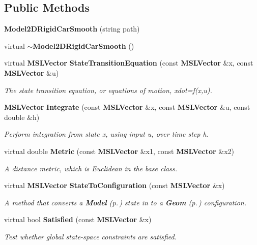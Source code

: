 \subsection*{Public Methods}
\begin{CompactItemize}
\item 
{\bf Model2DRigid\-Car\-Smooth} (string path)
\item 
virtual {\bf $\sim$Model2DRigid\-Car\-Smooth} ()
\item 
virtual {\bf MSLVector} {\bf State\-Transition\-Equation} (const {\bf MSLVector} \&x, const {\bf MSLVector} \&u)
\begin{CompactList}\small\item\em The state transition equation, or equations of motion, xdot=f(x,u).\item\end{CompactList}\item 
{\bf MSLVector} {\bf Integrate} (const {\bf MSLVector} \&x, const {\bf MSLVector} \&u, const double \&h)
\begin{CompactList}\small\item\em Perform integration from state x, using input u, over time step h.\item\end{CompactList}\item 
virtual double {\bf Metric} (const {\bf MSLVector} \&x1, const {\bf MSLVector} \&x2)
\begin{CompactList}\small\item\em A distance metric, which is Euclidean in the base class.\item\end{CompactList}\item 
virtual {\bf MSLVector} {\bf State\-To\-Configuration} (const {\bf MSLVector} \&x)
\begin{CompactList}\small\item\em A method that converts a {\bf Model} {\rm (p.\,\pageref{class_Model})} state in to a {\bf Geom} {\rm (p.\,\pageref{class_Geom})} configuration.\item\end{CompactList}\item 
virtual bool {\bf Satisfied} (const {\bf MSLVector} \&x)
\begin{CompactList}\small\item\em Test whether global state-space constraints are satisfied.\item\end{CompactList}\end{CompactItemize}

